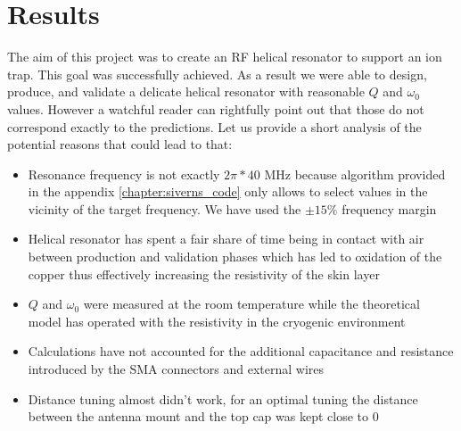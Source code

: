 \chapter{Results}

The aim of this project was to create an RF helical resonator to support an ion trap. This goal was successfully achieved. As a result we were able to design, produce, and validate a delicate helical resonator with reasonable $Q$ and $\omega_0$ values. However a watchful reader can rightfully point out that those do not correspond exactly to the predictions. Let us provide a short analysis of the potential reasons that could lead to that:

\begin{itemize}
	\item Resonance frequency is not exactly $2\pi*40$ MHz because algorithm provided in the appendix \ref{chapter:siverns_code} only allows to select values in the vicinity of the target frequency. We have used the $\pm 15\%$ frequency margin
	\item Helical resonator has spent a fair share of time being in contact with air between production and validation phases which has led to oxidation of the copper thus effectively increasing the resistivity of the skin layer
	\item $Q$ and $\omega_0$ were measured at the room temperature while the theoretical model has operated with the resistivity in the cryogenic environment
	\item Calculations have not accounted for the additional capacitance and resistance introduced by the SMA connectors and external wires
	\item Distance tuning almost didn't work, for an optimal tuning the distance between the antenna mount and the top cap was kept close to 0
\end{itemize}